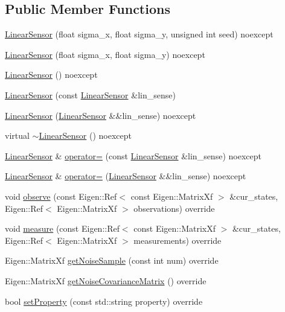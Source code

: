 \subsection*{Public Member Functions}
\begin{DoxyCompactItemize}
\item 
\mbox{\hyperlink{classbfl_1_1LinearSensor_a854aed4f95acda27e216c4a2415b55bf}{Linear\+Sensor}} (float sigma\+\_\+x, float sigma\+\_\+y, unsigned int seed) noexcept
\item 
\mbox{\hyperlink{classbfl_1_1LinearSensor_abbd0d6d3a0deb476e1bacaf646dac55f}{Linear\+Sensor}} (float sigma\+\_\+x, float sigma\+\_\+y) noexcept
\item 
\mbox{\hyperlink{classbfl_1_1LinearSensor_a97d9226a08646f7c97a0e1b0cc0cb672}{Linear\+Sensor}} () noexcept
\item 
\mbox{\hyperlink{classbfl_1_1LinearSensor_a18250e7dc68c624b40c6d5312ef516a1}{Linear\+Sensor}} (const \mbox{\hyperlink{classbfl_1_1LinearSensor}{Linear\+Sensor}} \&lin\+\_\+sense)
\item 
\mbox{\hyperlink{classbfl_1_1LinearSensor_a670ab864282594958582114039c11484}{Linear\+Sensor}} (\mbox{\hyperlink{classbfl_1_1LinearSensor}{Linear\+Sensor}} \&\&lin\+\_\+sense) noexcept
\item 
virtual \mbox{\hyperlink{classbfl_1_1LinearSensor_a667f4b3eb18dd9a45b60288aa4f57939}{$\sim$\+Linear\+Sensor}} () noexcept
\item 
\mbox{\hyperlink{classbfl_1_1LinearSensor}{Linear\+Sensor}} \& \mbox{\hyperlink{classbfl_1_1LinearSensor_a83054bf80986f7b1772e71fdb8b37040}{operator=}} (const \mbox{\hyperlink{classbfl_1_1LinearSensor}{Linear\+Sensor}} \&lin\+\_\+sense) noexcept
\item 
\mbox{\hyperlink{classbfl_1_1LinearSensor}{Linear\+Sensor}} \& \mbox{\hyperlink{classbfl_1_1LinearSensor_aa93327ef56a19a9712f736d12fbf2651}{operator=}} (\mbox{\hyperlink{classbfl_1_1LinearSensor}{Linear\+Sensor}} \&\&lin\+\_\+sense) noexcept
\item 
void \mbox{\hyperlink{classbfl_1_1LinearSensor_ae53acb6051164c0bcd32d5a6f88e5962}{observe}} (const Eigen\+::\+Ref$<$ const Eigen\+::\+Matrix\+Xf $>$ \&cur\+\_\+states, Eigen\+::\+Ref$<$ Eigen\+::\+Matrix\+Xf $>$ observations) override
\item 
void \mbox{\hyperlink{classbfl_1_1LinearSensor_a36f36ae6b935a8c535b553ff6a265f6a}{measure}} (const Eigen\+::\+Ref$<$ const Eigen\+::\+Matrix\+Xf $>$ \&cur\+\_\+states, Eigen\+::\+Ref$<$ Eigen\+::\+Matrix\+Xf $>$ measurements) override
\item 
Eigen\+::\+Matrix\+Xf \mbox{\hyperlink{classbfl_1_1LinearSensor_a5079f70d2a2995cff4ad3210dd1795f7}{get\+Noise\+Sample}} (const int num) override
\item 
Eigen\+::\+Matrix\+Xf \mbox{\hyperlink{classbfl_1_1LinearSensor_a7773e8de7eb58b07b1ca781b20d8537e}{get\+Noise\+Covariance\+Matrix}} () override
\item 
bool \mbox{\hyperlink{classbfl_1_1LinearSensor_a3d20baf95d4ea62c536c87e68238852f}{set\+Property}} (const std\+::string property) override
\end{DoxyCompactItemize}
